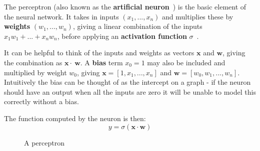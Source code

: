 \documentclass[12pt,a4paper,twoside,openright]{report}
\renewcommand{\vec}[1]{\bm{#1}}
\begin{document}
The perceptron (also known as the \textbf{artificial neuron}~\cite{WhatareA61:online}) is the basic element of the neural network. It takes in inputs $(x_1, ..., x_n)$ and 
multiplies these by \textbf{weights} $(w_1, ..., w_n)$, giving a linear combination of the inputs $x_1w_1 + ... + x_nw_n$, before applying 
an \textbf{activation function} $\sigma$~\cite{Art_Int}.

It can be helpful to think of the inputs and weights as 
vectors $\vec{x}$ and $\vec{w}$, giving the combination as $\vec{x} \cdot \ \vec{w}$. A \textbf{bias} term $x_0=1$ may also be included and multiplied by 
weight $w_0$, giving $\vec{x} = [1, x_1, ..., x_n]$ and $\vec{w} = [w_0, w_1, ..., w_n]$. Intuitively the bias can be thought of as the intercept
on a graph - if the neuron should have an output when all the inputs are zero it will be unable to model this correctly without a bias.

The function computed by the neuron is then:
\begin{equation}
  y = \sigma(\vec{x} \cdot \vec{w})
\end{equation}

\begin{figure}[H]
  \begin{center}
      \caption{A perceptron}
      \label{fig:illustration_perceptron}
  \end{center}
\end{figure}
\end{document}
